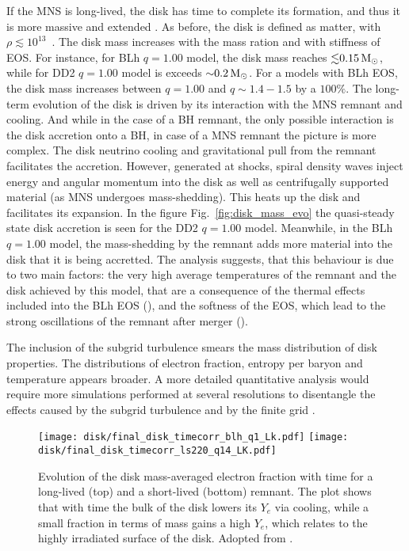 If the \ac{MNS} is long-lived, the disk has time to complete its formation,
and thus it is more massive and extended \citep{Perego:2019adq}. 
As before, the disk is defined as matter, with $\rho\lesssim10^{13}$~\gcm. 
The disk mass increases with the mass ration and with stiffness of \ac{EOS}.
For instance, for BLh $q=1.00$ model, the disk mass reaches ${\lesssim}0.15\,{\text{M}_{\odot}}$, 
while for DD2 $q=1.00$ model is exceeds ${\sim}0.2\,{\text{M}_{\odot}}$.
For a models with BLh \ac{EOS}, the disk mass increases between $q=1.00$ and 
$q\sim1.4-1.5$ by a $100\%$.
The long-term evolution of the disk is driven by its interaction with the \ac{MNS} 
remnant and cooling. 
And while in the case of a \ac{BH} remnant, the only possible interaction is the 
disk accretion onto a \ac{BH}, in case of a \ac{MNS} remnant the picture is more 
complex.
The disk neutrino cooling and gravitational pull from the remnant facilitates the 
accretion. However, generated at shocks, spiral density waves inject 
energy and angular momentum into the disk as well as centrifugally supported 
material (as \ac{MNS} undergoes mass-shedding). This heats up the disk and 
facilitates its expansion. 
In the figure  Fig.~\ref{fig:disk_mass_evo} the quasi-steady state disk accretion
is seen for the DD2 $q=1.00$ model. Meanwhile, in the BLh $q=1.00$ model, the 
mass-shedding by the remnant adds more material into the disk that it is being 
accretted. 
The analysis suggests, that this behaviour is due to two main factors: the 
very high average temperatures of the remnant and the disk achieved by this model, that 
are a consequence of the thermal effects included into the BLh EOS (),
and the softness of the EOS, which lead to the strong oscillations of the 
remnant after merger ().

The inclusion of the subgrid turbulence smears the mass distribution of disk 
properties. The distributions of electron fraction, entropy per baryon and 
temperature appears broader. A more detailed quantitative analysis would require more 
simulations performed at several resolutions to disentangle the effects 
caused by the subgrid turbulence and by the finite grid \citep{Bernuzzi:2020txg,Radice:2020ids}.

\begin{figure}[t]
    \centering 
    \texttt{[image: disk/final\_disk\_timecorr\_blh\_q1\_Lk.pdf]}
    \texttt{[image: disk/final\_disk\_timecorr\_ls220\_q14\_LK.pdf]}
    \caption{Evolution of the disk mass-averaged electron fraction with
        time for a long-lived (top) and a short-lived (bottom)
        remnant. The plot shows that with time the bulk of the disk lowers
        its $Y_e$ via cooling, while a small fraction in terms of mass
        gains a high $Y_e$, which relates to the highly 
        irradiated surface of the disk. Adopted from \citet{Nedora:2020pak}.
    }
    \label{fig:total_disk_time_corr_Ye_Blh_q1}
\end{figure}

